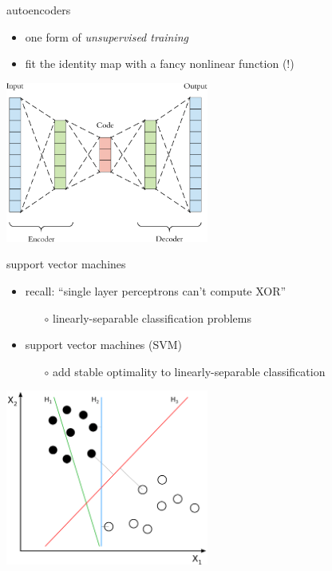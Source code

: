 \documentclass[xcolor={svgnames},
               hyperref={colorlinks,citecolor=DeepPink4,linkcolor=FireBrick,urlcolor=Maroon}]
               {beamer}
\begin{document}
\begin{frame}{autoencoders}

\begin{itemize}
\item one form of \emph{unsupervised training}
\item fit the identity map with a fancy nonlinear function (!)
\end{itemize}

\begin{center}
\includegraphics[width=0.5\textwidth]{figs/autoencoder}
\end{center}
\end{frame}


\begin{frame}{support vector machines}

\begin{itemize}
\item recall: ``single layer perceptrons can't compute XOR''
    \begin{itemize}
    \item[$\circ$] linearly-separable classification problems
    \end{itemize}
\item support vector machines (SVM)
    \begin{itemize}
    \item[$\circ$] add stable optimality to linearly-separable classification
    \end{itemize}
\end{itemize}

\medskip
\begin{center}
\includegraphics[width=0.5\textwidth]{figs/svm}
\end{center}
\end{frame}
\end{document}
